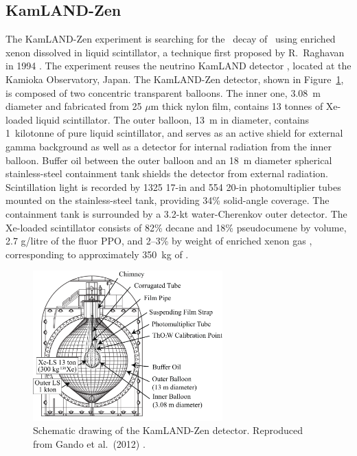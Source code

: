 \documentclass{PoS}
\begin{document}
\subsection{KamLAND-Zen}
The KamLAND-Zen experiment is searching for the \bbonu\ decay of \XE\ using enriched xenon dissolved in liquid scintillator, a technique first proposed by R.~Raghavan in 1994 \cite{Raghavan:1994qw}. The experiment reuses the neutrino KamLAND detector \cite{Abe:2009aa}, located at the Kamioka Observatory, Japan. The KamLAND-Zen detector, shown in Figure~\ref{fig:KamLANDZen}, is composed of two concentric transparent balloons. The inner one, 3.08~m diameter and fabricated from 25 $\mu$m thick nylon film, contains 13 tonnes of Xe-loaded liquid scintillator. The outer balloon, 13~m in diameter, contains 1~kilotonne of pure liquid scintillator, and serves as an active shield for external gamma background as well as a detector for internal radiation from the inner balloon. Buffer oil between the outer balloon and an 18~m diameter spherical stainless-steel containment tank shields the detector from external radiation. Scintillation light is recorded by 1325 17-in and 554 20-in photomultiplier tubes mounted on the stainless-steel tank, providing 34\% solid-angle coverage. The containment tank is surrounded by a 3.2-kt water-Cherenkov outer detector. The Xe-loaded scintillator consists of 82\% decane and 18\% pseudocumene by volume, 2.7 g/litre of the fluor PPO, and 2--3\% by weight of enriched xenon gas \cite{KamLANDZen:2012aa}, corresponding to approximately 350~kg of \XE.

\begin{figure}
\centering
\includegraphics[width=0.65\textwidth]{img/KamLANDZen.pdf}
\caption{Schematic drawing of the KamLAND-Zen detector. Reproduced from Gando et al.\ (2012) \cite{KamLANDZen:2012aa}.} \label{fig:KamLANDZen}
\end{figure}
\end{document}
